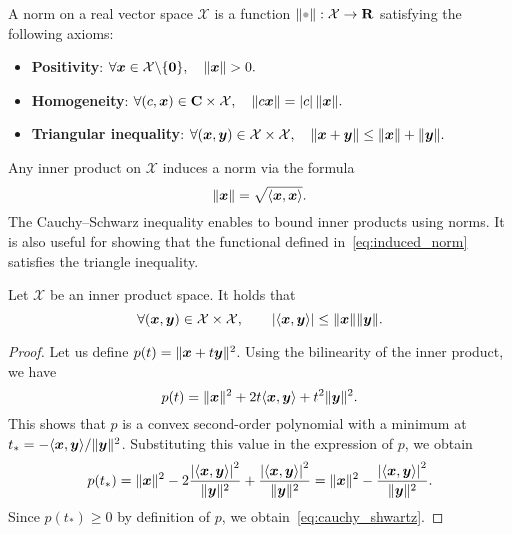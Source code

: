 \begin{definition}
A norm on a real vector space $\mathcal X$ is a function $\norm{\placeholder}: \mathcal X \to \real$ satisfying the following axioms:
\begin{itemize}
    \item
        \textbf{Positivity}:
        \(
            \forall \mathbf{\boldsymbol{x}} \in \mathcal X \backslash \{\mathbf{\boldsymbol{0}}\}, \quad
            \lVert\mathbf{\boldsymbol{x}}\rVert > 0.
        \)

    \item
        \textbf{Homogeneity}:
        \(
            \forall (c, \mathbf{\boldsymbol{x}}) \in \mathbf C \times \mathcal X, \quad
            \lVert c \mathbf{\boldsymbol{x}}\rVert = \lvert c\rvert \, \lVert\mathbf{\boldsymbol{x}}\rVert .
        \)

    \item
        \textbf{Triangular inequality}:
        \(
            \forall (\mathbf{\boldsymbol{x}}, \mathbf{\boldsymbol{y}}) \in \mathcal X \times \mathcal X, \quad
            \lVert\mathbf{\boldsymbol{x}} + \mathbf{\boldsymbol{y}}\rVert \leq \lVert\mathbf{\boldsymbol{x}}\rVert + \lVert\mathbf{\boldsymbol{y}}\rVert.
        \)
\end{itemize}
\end{definition}
Any inner product on $\mathcal X$ induces a norm via the formula
\begin{equation}
    \label{eq:induced_norm}%
    \norm{\vect x} = \sqrt{\ip{\vect x, \vect x}}.
\end{equation}
The Cauchy--Schwarz inequality enables to bound inner products using norms.
It is also useful for showing that the functional defined in~\eqref{eq:induced_norm} satisfies the triangle inequality.
\begin{proposition}
    \label{proposition:cauchy_shwartz}
    Let $\mathcal X$ be an inner product space.
    It holds that
    \begin{equation}
        \label{eq:cauchy_shwartz}
        \forall  (\vect x, \vect y) \in \mathcal X \times \mathcal X, \qquad
        \abs[big]{\ip{\vect x, \vect y}} \leq \norm{\vect x} \norm{\vect y}.
    \end{equation}
\end{proposition}
\begin{proof}
    Let us define $p(t) = \lVert\mathbf{\boldsymbol{x}} + t \mathbf{\boldsymbol{y}}\rVert^2$.
    Using the bilinearity of the inner product,
    we have
    \[
        p(t) = \lVert\mathbf{\boldsymbol{x}}\rVert^2 + 2 t \langle\mathbf{\boldsymbol{x}}, \mathbf{\boldsymbol{y}}\rangle + t^2 \lVert\mathbf{\boldsymbol{y}}\rVert^2.
    \]
    This shows that $p$ is a convex second-order polynomial with a minimum at $t_* = - \langle\mathbf{\boldsymbol{x}}, \mathbf{\boldsymbol{y}}\rangle / \lVert\mathbf{\boldsymbol{y}}\rVert^2$.
    Substituting this value in the expression of $p$,
    we obtain
    \[
        p(t_*) = \norm{\vect x}^2 - 2 \frac{\abs[big]{\ip{\vect x, \vect y}}^2}{\norm{\vect y}^2} +  \frac{\abs[big]{\ip{\vect x, \vect y}}^2}{\norm{\vect y}^2}
        = \norm{\vect x}^2 - \frac{\abs[big]{\ip{\vect x, \vect y}}^2}{\norm{\vect y}^2}.
    \]
    Since $p(t_*) \geq 0$ by definition of $p$,
    we obtain~\eqref{eq:cauchy_shwartz}.
\end{proof}

